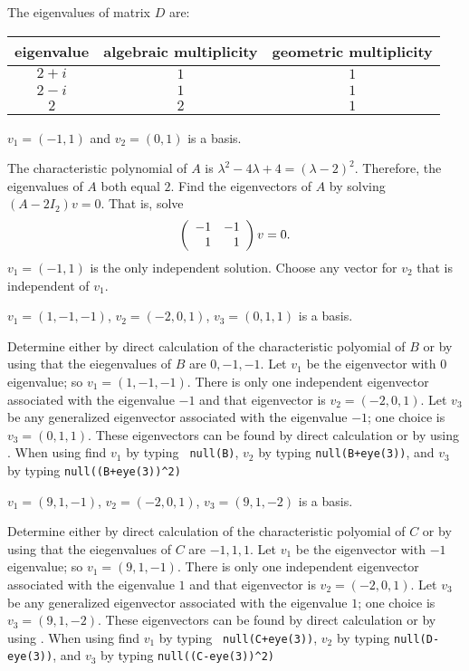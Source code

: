  The eigenvalues of matrix $D$ are:
\begin{center}
\begin{tabular}{|c|c|c|}
\hline
eigenvalue & algebraic multiplicity & geometric multiplicity \\
\hline
$2 + i$ & $1$ & $1$ \\
$2 - i$ & $1$ & $1$ \\
$2$ & $2$ & $1$ \\
\hline
\end{tabular}
\end{center}

 \ans $v_1=(-1,1)$ and $v_2 = (0,1)$ is a basis.

\soln  The characteristic polynomial of $A$ is $\lambda^2-4\lambda+4=(\lambda-2)^2$.
Therefore, the eigenvalues of $A$ both equal $2$.  Find the eigenvectors of $A$ by 
solving $(A-2I_2)v=0$.  That is, solve
\[
\left(\begin{array}{rr} -1 & -1\\ 1 &1\end{array}\right)v = 0.
\]
$v_1=(-1,1)$ is the only independent solution.  Choose any vector for $v_2$ that is
independent of $v_1$.

 \ans $v_1=(1,-1,-1)$, $v_2=(-2,0,1)$, $v_3=(0,1,1)$ is a basis.

\soln  Determine either by direct calculation of the characteristic polyomial of $B$ 
or by using \Matlab that the eiegenvalues of $B$ are $0,-1,-1$.  Let $v_1$ be the
eigenvector with $0$ eigenvalue; so $v_1=(1,-1,-1)$.  There is only one independent 
eigenvector associated with the eigenvalue $-1$ and that eigenvector is
$v_2=(-2,0,1)$.  Let $v_3$ be any generalized eigenvector associated with the
eigenvalue $-1$; one choice is $v_3=(0,1,1)$.  These eigenvectors can be found by
direct calculation or by using \Matlab.  When using \Matlab find $v_1$ by typing {\tt
null(B)}, $v_2$ by typing {\tt null(B+eye(3))}, and $v_3$ by typing 
{\tt null((B+eye(3))\^{}2)}

 \ans $v_1=(9,1,-1)$, $v_2=(-2,0,1)$, $v_3=(9,1,-2)$ is a basis.

\soln  Determine either by direct calculation of the characteristic polyomial of $C$ 
or by using \Matlab that the eiegenvalues of $C$ are $-1,1,1$.  Let $v_1$ be the
eigenvector with $-1$ eigenvalue; so $v_1=(9,1,-1)$.  There is only one independent 
eigenvector associated with the eigenvalue $1$ and that eigenvector is
$v_2=(-2,0,1)$.  Let $v_3$ be any generalized eigenvector associated with the
eigenvalue $1$; one choice is $v_3=(9,1,-2)$.  These eigenvectors can be found by
direct calculation or by using \Matlab.  When using \Matlab find $v_1$ by typing {\tt
null(C+eye(3))}, $v_2$ by typing {\tt null(D-eye(3))}, and $v_3$ by typing 
{\tt null((C-eye(3))\^{}2)}


